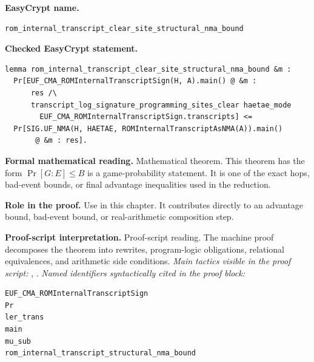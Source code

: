 \begin{formaltheorem}
\noindent\textbf{EasyCrypt name.}
\begin{lstlisting}[language=EasyCrypt,basicstyle=\ttfamily\scriptsize]
rom_internal_transcript_clear_site_structural_nma_bound
\end{lstlisting}
\noindent\textbf{Checked EasyCrypt statement.}
\begin{lstlisting}[language=EasyCrypt,basicstyle=\ttfamily\scriptsize]
lemma rom_internal_transcript_clear_site_structural_nma_bound &m :
  Pr[EUF_CMA_ROMInternalTranscriptSign(H, A).main() @ &m :
      res /\
      transcript_log_signature_programming_sites_clear haetae_mode
        EUF_CMA_ROMInternalTranscriptSign.transcripts] <=
  Pr[SIG.UF_NMA(H, HAETAE, ROMInternalTranscriptAsNMA(A)).main()
       @ &m : res].
\end{lstlisting}
\noindent\textbf{Formal mathematical reading.}
Mathematical theorem. This theorem has the form \(\Pr[G:E] \le B\) is a game-probability statement.  It is one of the exact hops, bad-event bounds, or final advantage inequalities used in the reduction.

\noindent\textbf{Role in the proof.}
Use in this chapter. It contributes directly to an advantage bound, bad-event bound, or real-arithmetic composition step.

\noindent\textbf{Proof-script interpretation.}
Proof-script reading. The machine proof decomposes the theorem into rewrites, program-logic obligations, relational equivalences, and arithmetic side conditions.
\emph{Main tactics visible in the proof script:} \ec{apply}, \ec{rewrite}.
\emph{Named identifiers syntactically cited in the proof block:}
\begin{lstlisting}[language=EasyCrypt,basicstyle=\ttfamily\scriptsize]
EUF_CMA_ROMInternalTranscriptSign
Pr
ler_trans
main
mu_sub
rom_internal_transcript_structural_nma_bound
\end{lstlisting}

\end{formaltheorem}

